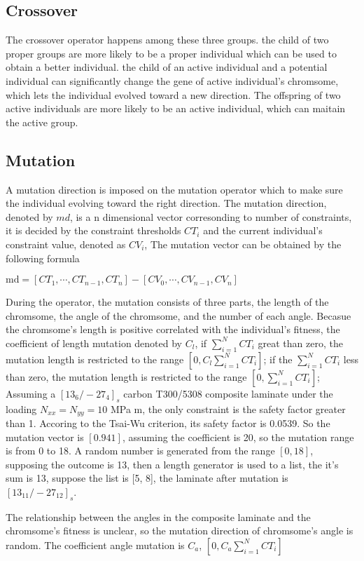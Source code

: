 	
\subsection{Crossover}
The crossover operator happens among these three groups. the child of two proper groups are more
likely to be a proper individual which can be used to obtain a better individual. the child of an
active individual and a potential individual can significantly change the gene of active
individual's chromsome, which lets the individual evolved toward a new direction.  The offspring of
two active individuals are more likely to be an active individual, which can maitain the active
group.
\subsection{Mutation}
A mutation direction is imposed on the mutation operator which to make sure the individual evolving
toward the right direction. The mutation direction, denoted by $md$, is a n dimensional vector corresonding to
number of constraints, it is decided by the constraint thresholds $CT_i$ and the current individual's
constraint value, denoted as $CV_i$,  The mutation vector can be obtained by the following formula

$\text{md} = [CT_1, \cdots, CT_{n-1}, CT_n] -  [CV_0, \cdots, CV_{n-1}, CV_n]$

During the operator, the mutation consists of three parts, the length of the chromsome, the angle
of the chromsome, and the number of each angle. Becasue the chromsome's length is positive correlated with the individual's
fitness, the coefficient of length mutation denoted by $C_l$, if $\sum_{i=1}^{N}{CT_i}$ great than
zero, the mutation length is restricted to the range $[0,C_l \sum_{i=1}^{N}{CT_i}]$; if the
$\sum_{i=1}^{N}{CT_i}$ less than zero, the mutation length is restricted to the range
$[0,\sum_{i=1}^{N}{CT_i}]$; Assuming a $[13_6/-27_4]_s$ carbon T300/5308 composite laminate under
the loading $N_{xx} = N_{yy} = 10$ MPa m, the only constraint is the safety factor greater than 1.
Accoring to the Tsai-Wu criterion, its safety factor is 0.0539. So the mutation vector is $[0.941]$,
assuming the coefficient is 20, so the mutation range is from 0 to 18. A random number is generated
from the range $[0, 18]$, supposing the outcome is 13, then a length generator is used to a list,
the it's sum is 13, suppose the list is [5, 8], the laminate after mutation is $[13_{11}/-27_{12}]_s$.


The relationship between the angles in the composite laminate and the chromsome's fitness is
unclear, so the mutation direction of chromsome's angle is random. The coefficient angle mutation is
$C_a$, $[0,C_a \sum_{i=1}^{N}{CT_i}]$

